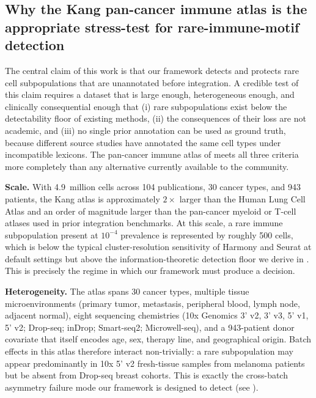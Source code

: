 
\subsection{Why the Kang pan-cancer immune atlas is the appropriate
stress-test for rare-immune-motif detection}
\label{sec:kang-stress-test-rationale}

The central claim of this work is that our framework detects and
protects rare cell subpopulations that are unannotated before
integration. A credible test of this claim requires a dataset that is
large enough, heterogeneous enough, and clinically consequential
enough that (i) rare subpopulations exist below the detectability
floor of existing methods, (ii) the consequences of their loss are
not academic, and (iii) no single prior annotation can be used as
ground truth, because different source studies have annotated the
same cell types under incompatible lexicons. The pan-cancer immune
atlas of \citet{kang2024integrated} meets all three criteria more
completely than any alternative currently available to the
community.

\textbf{Scale.} With 4.9~million cells across 104 publications, 30
cancer types, and 943 patients, the Kang atlas is approximately
$2\times$ larger than the Human Lung Cell Atlas
\citep{sikkema2023integrated} and an order of magnitude larger than
the pan-cancer myeloid \citep{cheng2021pancancer} or T-cell
\citep{zheng2021pancancer} atlases used in prior integration
benchmarks. At this scale, a rare immune subpopulation present at
$10^{-4}$ prevalence is represented by roughly 500 cells, which is
below the typical cluster-resolution sensitivity of Harmony and
Seurat at default settings but above the information-theoretic
detection floor we derive in . This
is precisely the regime in which our framework must produce a
decision.

\textbf{Heterogeneity.} The atlas spans 30 cancer types, multiple
tissue microenvironments (primary tumor, metastasis, peripheral
blood, lymph node, adjacent normal), eight sequencing chemistries
(10x Genomics 3' v2, 3' v3, 5' v1, 5' v2; Drop-seq; inDrop; Smart-seq2;
Microwell-seq), and a 943-patient donor covariate that itself
encodes age, sex, therapy line, and geographical origin. Batch
effects in this atlas therefore interact non-trivially: a rare
subpopulation may appear predominantly in 10x 5' v2 fresh-tissue
samples from melanoma patients but be absent from Drop-seq breast
cohorts. This is exactly the cross-batch asymmetry failure mode our
framework is designed to detect (see
).

